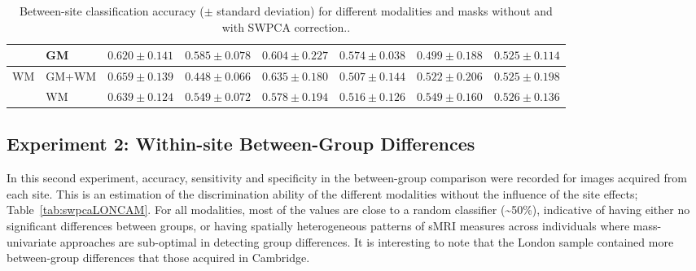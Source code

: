 \begin{table}
\begin{tabularx}{\textwidth}{XX|XX|XX|XX}
		&	GM &	$ 0.620 \pm 0.141 $ & $ 0.585 \pm 0.078 $ & $ 0.604 \pm 0.227 $ & $ 0.574 \pm 0.038 $  &	$ 0.499 \pm 0.188 $ &  $ 0.525 \pm 0.114 $ \\
		\midrule
		\multirow{2}{*}{\ac{WM}} &GM+WM &	$ 0.659 \pm 0.139 $ & $ 0.448 \pm 0.066 $ & $ 0.635 \pm 0.180 $ & $ 0.507 \pm 0.144 $  &	$ 0.522 \pm 0.206 $  & $ 0.525 \pm 0.198 $ \\
		&	WM & $ 0.639 \pm 0.124 $ & $ 0.549 \pm 0.072 $ & $ 0.578 \pm 0.194 $ & $ 0.516 \pm 0.126 $  & 	$ 0.549 \pm 0.160 $ &  $ 0.526 \pm 0.136 $ \\
		\bottomrule
	\end{tabularx}
	\caption[Between-site classification accuracy ($\pm$ standard deviation) for
	different modalities and masks without and with SWPCA correction.]{Between-site classification accuracy ($\pm$ standard deviation) for different modalities and masks without and with \ac{SWPCA} correction..}
	\label{tab:swpcaAqSite}
\end{table}


\subsection{Experiment 2: Within-site Between-Group Differences}\label{sec:swpcaE2}
In this second experiment, accuracy, sensitivity and specificity in the
between-group comparison were recorded for images acquired from each
site. This is an estimation of the discrimination ability of the
different modalities without the influence of the site effects;
Table~\ref{tab:swpcaLONCAM}. For all modalities, most of the values are close to a random
classifier (\~{}50\%), indicative of having either no significant
differences between groups, or having spatially heterogeneous patterns
of s\ac{MRI} measures across individuals where mass-univariate approaches
are sub-optimal in detecting group differences. It is interesting to
note that the London sample contained more between-group differences
that those acquired in Cambridge. 

